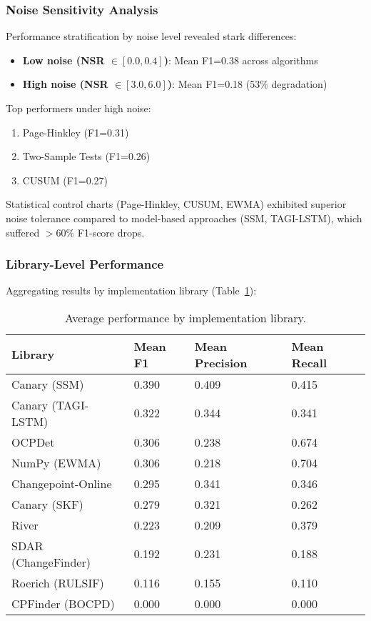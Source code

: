 \subsubsection{Noise Sensitivity Analysis}

Performance stratification by noise level revealed stark differences:

\begin{itemize}
    \item \textbf{Low noise (NSR $\in [0.0, 0.4]$)}: Mean F1=0.38 across algorithms
    \item \textbf{High noise (NSR $\in [3.0, 6.0]$)}: Mean F1=0.18 (53\% degradation)
\end{itemize}

Top performers under high noise:
\begin{enumerate}
    \item Page-Hinkley (F1=0.31)
    \item Two-Sample Tests (F1=0.26)
    \item CUSUM (F1=0.27)
\end{enumerate}

Statistical control charts (Page-Hinkley, CUSUM, EWMA) exhibited superior noise tolerance compared to model-based approaches (SSM, TAGI-LSTM), which suffered $>60\%$ F1-score drops.

\subsubsection{Library-Level Performance}

Aggregating results by implementation library (Table~\ref{tab:library_ranking}):

\begin{table}[H]
\caption{Average performance by implementation library.\label{tab:library_ranking}}
\begin{tabularx}{\textwidth}{lXXX}
\toprule
\textbf{Library} & \textbf{Mean F1} & \textbf{Mean Precision} & \textbf{Mean Recall} \\
\midrule
Canary (SSM) & 0.390 & 0.409 & 0.415 \\
Canary (TAGI-LSTM) & 0.322 & 0.344 & 0.341 \\
OCPDet & 0.306 & 0.238 & 0.674 \\
NumPy (EWMA) & 0.306 & 0.218 & 0.704 \\
Changepoint-Online & 0.295 & 0.341 & 0.346 \\
Canary (SKF) & 0.279 & 0.321 & 0.262 \\
River & 0.223 & 0.209 & 0.379 \\
SDAR (ChangeFinder) & 0.192 & 0.231 & 0.188 \\
Roerich (RULSIF) & 0.116 & 0.155 & 0.110 \\
CPFinder (BOCPD) & 0.000 & 0.000 & 0.000 \\
\bottomrule
\end{tabularx}
\end{table}

